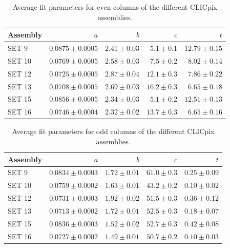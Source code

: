 \begin{table}[h!]
\centering
\begin{tabular}{ l r r r r}
\hline
Assembly & $a$ & $b$ & $c$ & $t$ \\ 
\hline
SET 9   & $0.0875 \pm 0.0005$ & $2.41 \pm 0.03$ & $5.1 \pm 0.1$ & $12.79 \pm 0.15$ \\
SET 10 & $0.0769 \pm 0.0005$ & $2.58 \pm 0.03$ & $7.5 \pm 0.2$ & $8.02 \pm 0.14$ \\
SET 12 & $0.0725 \pm 0.0005$ & $2.87 \pm 0.04$ & $12.1 \pm 0.3$ & $7.86 \pm 0.22$  \\
SET 13 & $0.0708 \pm 0.0005$ & $2.69 \pm 0.03$ & $16.2 \pm 0.3$ & $6.65 \pm 0.18$ \\
SET 15 & $0.0856 \pm 0.0005$ & $2.34 \pm 0.03$ & $5.1 \pm 0.2$ & $12.51 \pm 0.13$ \\
SET 16 & $0.0746 \pm 0.0004$ & $2.32 \pm 0.02$ & $13.7 \pm 0.3$ & $6.65\pm 0.16$ \\
\hline
\end{tabular}
\caption[Average fit parameters for even columns of CLICpix sensor.]{Average fit parameters for even columns of the different CLICpix assemblies.}
\label{table:clicpixfitparamseven}
\end{table}

\begin{table}[h!]
\centering
\begin{tabular}{ l r r r r}
\hline
Assembly & $a$ & $b$ & $c$ & $t$ \\ 
\hline
SET 9   & $0.0834 \pm 0.0003$ & $1.72 \pm 0.01$ & $61.0 \pm 0.3$ & $0.25 \pm 0.09$ \\
SET 10 & $0.0759 \pm 0.0002$ & $1.63 \pm 0.01$ & $43.2 \pm 0.2$ & $0.10 \pm 0.02$ \\
SET 12 & $0.0731 \pm 0.0003$ & $1.92 \pm 0.02$ & $51.5 \pm 0.3$ & $0.36 \pm 0.12$ \\
SET 13 & $0.0713 \pm 0.0002$ & $1.72 \pm 0.01$ & $52.5 \pm 0.3$ & $0.18 \pm 0.07$ \\
SET 15 & $0.0836 \pm 0.0003$ & $1.52 \pm 0.02$ & $52.7 \pm 0.3$ & $0.42 \pm 0.08$ \\
SET 16  & $0.0727 \pm 0.0002$ & $1.49 \pm 0.01$ & $50.7 \pm 0.2$ & $0.10 \pm 0.03$ \\
\hline
\end{tabular}
\caption[Average fit parameters for odd columns of CLICpix sensor.]{Average fit parameters for odd columns of the different CLICpix assemblies.}
\label{table:clicpixfitparamsodd}
\end{table}

